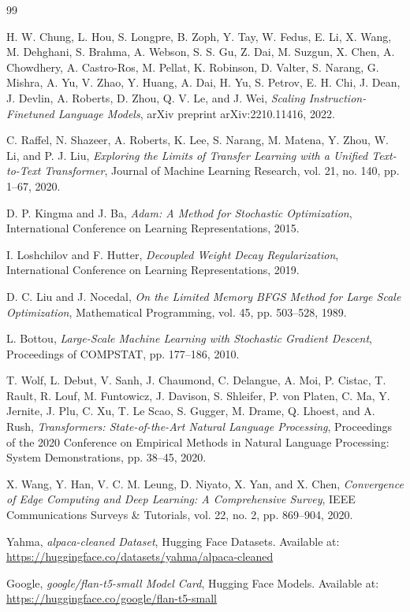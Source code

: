 \begin{thebibliography}{99}

H. W. Chung, L. Hou, S. Longpre, B. Zoph, Y. Tay, W. Fedus, E. Li, X. Wang,
M. Dehghani, S. Brahma, A. Webson, S. S. Gu, Z. Dai, M. Suzgun, X. Chen,
A. Chowdhery, A. Castro-Ros, M. Pellat, K. Robinson, D. Valter, S. Narang,
G. Mishra, A. Yu, V. Zhao, Y. Huang, A. Dai, H. Yu, S. Petrov, E. H. Chi,
J. Dean, J. Devlin, A. Roberts, D. Zhou, Q. V. Le, and J. Wei,
\textit{Scaling Instruction-Finetuned Language Models},
arXiv preprint arXiv:2210.11416, 2022.

C. Raffel, N. Shazeer, A. Roberts, K. Lee, S. Narang, M. Matena,
Y. Zhou, W. Li, and P. J. Liu,
\textit{Exploring the Limits of Transfer Learning with a Unified Text-to-Text Transformer},
Journal of Machine Learning Research, vol. 21, no. 140, pp. 1--67, 2020.

D. P. Kingma and J. Ba,
\textit{Adam: A Method for Stochastic Optimization},
International Conference on Learning Representations, 2015.

I. Loshchilov and F. Hutter,
\textit{Decoupled Weight Decay Regularization},
International Conference on Learning Representations, 2019.

D. C. Liu and J. Nocedal,
\textit{On the Limited Memory BFGS Method for Large Scale Optimization},
Mathematical Programming, vol. 45, pp. 503--528, 1989.

L. Bottou,
\textit{Large-Scale Machine Learning with Stochastic Gradient Descent},
Proceedings of COMPSTAT, pp. 177--186, 2010.

T. Wolf, L. Debut, V. Sanh, J. Chaumond, C. Delangue, A. Moi,
P. Cistac, T. Rault, R. Louf, M. Funtowicz, J. Davison, S. Shleifer,
P. von Platen, C. Ma, Y. Jernite, J. Plu, C. Xu, T. Le Scao, S. Gugger,
M. Drame, Q. Lhoest, and A. Rush,
\textit{Transformers: State-of-the-Art Natural Language Processing},
Proceedings of the 2020 Conference on Empirical Methods in Natural Language
Processing: System Demonstrations, pp. 38--45, 2020.

X. Wang, Y. Han, V. C. M. Leung, D. Niyato, X. Yan, and X. Chen,
\textit{Convergence of Edge Computing and Deep Learning: A Comprehensive Survey},
IEEE Communications Surveys \& Tutorials, vol. 22, no. 2, pp. 869--904, 2020.

Yahma,
\textit{alpaca-cleaned Dataset},
Hugging Face Datasets.
Available at: \url{https://huggingface.co/datasets/yahma/alpaca-cleaned}

Google,
\textit{google/flan-t5-small Model Card},
Hugging Face Models.
Available at: \url{https://huggingface.co/google/flan-t5-small}

\end{thebibliography}
